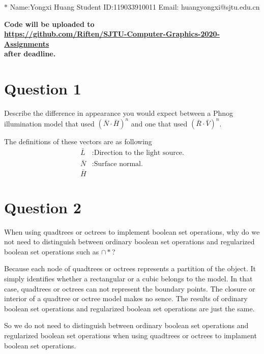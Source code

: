 \documentclass[12pt,a4paper]{article}
\makeatletter
\newtheorem*{solution}{Solution}
\theoremstyle{definition}
\numberwithin{equation}{section}
\numberwithin{figure}{section}
\renewenvironment{solution}[1][Solution] {\par\pushQED{\qed}\normalfont\topsep6\p@\@plus6\p@\relax\trivlist\item[\hskip\labelsep\bfseries#1\@addpunct{.}]\ignorespaces}{\popQED\endtrivlist\@endpefalse} \makeatother
\makeatother
\begin{document}
\noindent

\noindent{}
\begin{center}

\footnotesize{\color{blue}$*$ Name:Yongxi Huang  \quad Student ID:119033910011 \quad Email: huangyongxi@sjtu.edu.cn}
\end{center}

\noindent\textbf{Code will be uploaded to \\
	\url{https://github.com/Riften/SJTU-Computer-Graphics-2020-Assignments}\\
	 after deadline.}

\section{Question 1}
Describe the difference in appearance you would expect between a Phnog illumination model that used $(\bar{N}\cdot \bar{H})^n$ and one that used $(\bar{R}\cdot \bar{V})^n$.

\begin{solution}
	The definitions of these vectors are as following
	\begin{align*}
	\bar{L}&: \text{Direction to the light source.}\\
	\bar{N}&: \text{Surface normal.}\\
	\bar{H}
	\end{align*}
\end{solution}

\section{Question 2}
When using quadtrees or octrees to implement boolean set operations, why do we not need to distinguish between ordinary boolean set operations and regularized boolean set operations such as $\cap*$?

\begin{solution}
	Because each node of quadtrees or octrees represents a partition of the object. It simply identifies whether a rectangular or a cubic belongs to the model. In that case, quadtrees or octrees can not represent the boundary points. The closure or interior of a quadtree or octree model makes no sence. The results of ordinary boolean set operations and regularized boolean set operations are just the same.
	
	So we do not need to distinguish between ordinary boolean set operations and regularized boolean set operations when using quadtrees or octrees to implament boolean set operations.
\end{solution}

%
\end{document}
